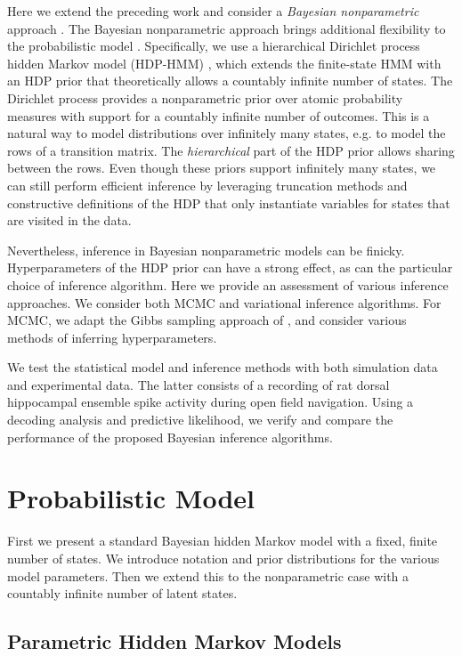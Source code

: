 Here we extend the preceding work and consider a \emph{Bayesian nonparametric} 
approach \citep{orbanz2011bayesian}.  The Bayesian nonparametric approach brings
additional flexibility to the probabilistic model
\citep{Teh10,Wood08,Shalchyan14}.  Specifically, we use a hierarchical
Dirichlet process hidden Markov model (HDP-HMM) \citep{Teh06}, which
extends the finite-state HMM with an HDP prior that theoretically
allows a countably infinite number of states.  The Dirichlet process
provides a nonparametric prior over atomic probability measures with
support for a countably infinite number of outcomes. This is a natural
way to model distributions over infinitely many states, e.g. to model
the rows of a transition matrix.  The \emph{hierarchical} part of the
HDP prior allows sharing between the rows. Even though these priors
support infinitely many states, we can still perform efficient
inference by leveraging truncation methods and constructive
definitions of the HDP that only instantiate variables for states that
are visited in the data.

Nevertheless, inference in Bayesian nonparametric models can be
finicky.  Hyperparameters of the HDP prior can have a strong effect,
as can the particular choice of inference algorithm. Here we provide an
assessment of various inference approaches. We consider both
MCMC and variational inference algorithms. For MCMC, we adapt the
Gibbs sampling approach of \citep{Teh06}, and consider various methods
of inferring hyperparameters.

We test the statistical model and inference methods with both
simulation data and experimental data. The latter consists of a
recording of rat dorsal hippocampal ensemble spike activity during
open field navigation. Using a decoding analysis and predictive
likelihood, we verify and compare the performance of the proposed
Bayesian inference algorithms. 

\section{Probabilistic Model}

First we present a standard Bayesian hidden Markov model with a fixed,
finite number of states. We introduce notation and prior distributions
for the various model parameters. Then we extend this to the nonparametric
case with a countably infinite number of latent states.

\subsection{Parametric Hidden Markov Models} 

